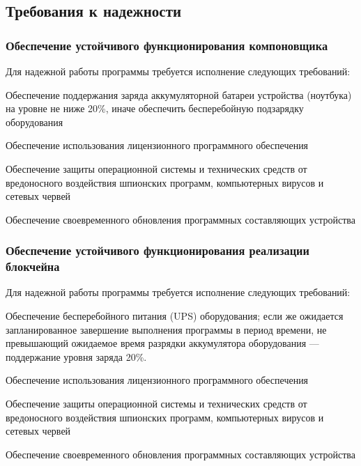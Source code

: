 \subsection{Требования к надежности}
\subsubsection{Обеспечение устойчивого функционирования компоновщика}

Для надежной работы программы требуется исполнение следующих требований:
\begin{my_enumerate}
    \item Обеспечение поддержания заряда аккумуляторной батареи устройства
          (ноутбука) на уровне не ниже 20\%, иначе обеспечить бесперебойную
          подзарядку оборудования
    \item Обеспечение использования лицензионного программного обеспечения
    \item Обеспечение защиты операционной системы и технических средств от
          вредоносного воздействия шпионских программ, компьютерных вирусов и
          сетевых червей
    \item Обеспечение своевременного обновления программных составляющих
          устройства
\end{my_enumerate}


\subsubsection{Обеспечение устойчивого функционирования реализации блокчейна}

Для надежной работы программы требуется исполнение следующих требований:
\begin{my_enumerate}
    \item Обеспечение бесперебойного питания (UPS) оборудования; если же
          ожидается запланированное завершение выполнения программы в период
          времени, не превышающий ожидаемое время разрядки аккумулятора
          оборудования --- поддержание уровня заряда 20\%.
    \item Обеспечение использования лицензионного программного обеспечения
    \item Обеспечение защиты операционной системы и технических средств от
          вредоносного воздействия шпионских программ, компьютерных вирусов и
          сетевых червей
    \item Обеспечение своевременного обновления программных составляющих
          устройства
\end{my_enumerate}
